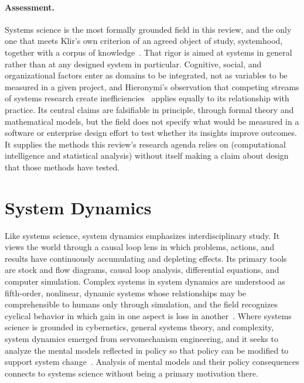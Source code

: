 \documentclass{csimq}
\begin{document}
\paragraph{Assessment.} Systems science is the most formally grounded field in this review, and the only one that meets Klir's own criterion of an agreed object of study, systemhood, together with a corpus of knowledge~\cite{klir2001}. That rigor is aimed at systems in general rather than at any designed system in particular. Cognitive, social, and organizational factors enter as domains to be integrated, not as variables to be measured in a given project, and Hieronymi's observation that competing streams of systems research create inefficiencies~\cite{hieronymi2013} applies equally to its relationship with practice. Its central claims are falsifiable in principle, through formal theory and mathematical models, but the field does not specify what would be measured in a software or enterprise design effort to test whether its insights improve outcomes. It supplies the methods this review's research agenda relies on (computational intelligence and statistical analysis) without itself making a claim about design that those methods have tested.

\section{System Dynamics}
\label{sec:sd}

Like systems science, system dynamics emphasizes interdisciplinary study. It
views the world through a causal loop lens in which problems, actions, and
results have continuously accumulating and depleting effects. Its primary tools
are stock and flow diagrams, causal loop analysis, differential equations, and
computer simulation. Complex systems in system dynamics are understood as
fifth-order, nonlinear, dynamic systems whose relationships may be
comprehensible to humans only through simulation, and the field recognizes
cyclical behavior in which gain in one aspect is loss in
another~\cite{forrester2009}. Where systems science is grounded in cybernetics,
general systems theory, and complexity, system dynamics emerged from
servomechanism engineering, and it seeks to analyze the mental models reflected
in policy so that policy can be modified to support system
change~\cite{lane2000}. Analysis of mental models and their policy consequences
connects to systems science without being a primary motivation there.
\end{document}
